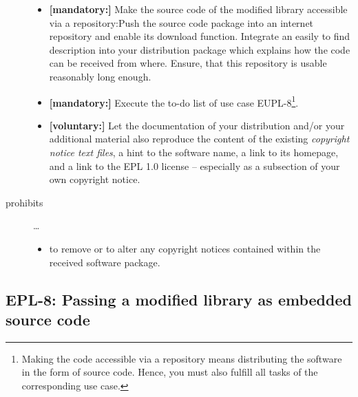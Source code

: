 \begin{description}
\begin{itemize}
  \item \textbf{[mandatory:]} Make the source code of the modified library
  accessible via a repository:Push the source code package into an internet
  repository and enable its download function. Integrate an easily to find
  description into your distribution package which explains how the code can be
  received from where. Ensure, that this repository is usable reasonably long
  enough.
  
  \item \textbf{[mandatory:]} Execute the to-do list of use case EUPL-8\footnote{
  Making the code accessible via a repository means distributing the software in
  the form of source code. Hence, you must also fulfill all tasks of the
  corresponding use case.}.
  
 
  \item \textbf{[voluntary:]} Let the documentation of your distribution and/or
  your additional material  also reproduce the content of the existing
  \emph{copyright notice text files}, a hint to the software name, a link to its
  homepage, and a link to the EPL 1.0 license -- especially as a subsection of
  your own copyright notice.
  
\end{itemize}

\item[prohibits] \ldots
\begin{itemize}
  \item to remove or to alter any copyright notices contained within the
  received software package.
\end{itemize}

\end{description}

\subsection{EPL-8: Passing a modified library as embedded source code}
\label{OSUC-10-EPL}

